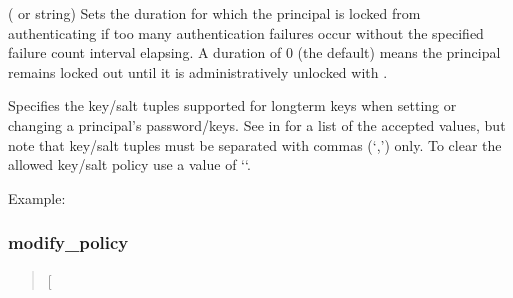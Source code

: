 \documentclass[letterpaper,10pt,english]{sphinxmanual}
\begin{document}
\label{\detokenize{admin/admin_commands/kadmin_local:policy-lockoutduration}}\begin{description}
\sphinxAtStartPar
( or  string) Sets the duration for
which the principal is locked from authenticating if too many
authentication failures occur without the specified failure count
interval elapsing.  A duration of 0 (the default) means the
principal remains locked out until it is administratively unlocked
with .

\sphinxAtStartPar
Specifies the key/salt tuples supported for long\sphinxhyphen{}term keys when
setting or changing a principal’s password/keys.  See
{\hyperref[\detokenize{admin/conf_files/kdc_conf:keysalt-lists}]{}} in {\hyperref[\detokenize{admin/conf_files/kdc_conf:kdc-conf-5}]{}} for a list of the
accepted values, but note that key/salt tuples must be separated
with commas (‘,’) only.  To clear the allowed key/salt policy use
a value of ‘\sphinxhyphen{}‘.

\end{description}

\sphinxAtStartPar
Example:

\begin{sphinxVerbatim}[commandchars=\\\{\}]
      
\end{sphinxVerbatim}


\subsubsection{modify\_policy}
\label{\detokenize{admin/admin_commands/kadmin_local:modify-policy}}\label{\detokenize{admin/admin_commands/kadmin_local:id14}}\begin{quote}

\sphinxAtStartPar
{} {[}\sphinxstyleemphasis{options}{]} 
\end{quote}
\end{document}
